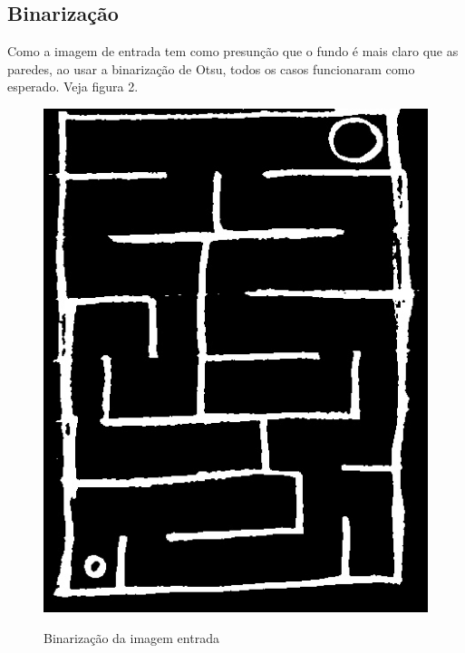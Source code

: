 \documentclass[conference]{IEEEtran}
\begin{document}
 \subsection{Binarização}
 Como a imagem de entrada tem como presunção que o fundo é mais claro que as paredes, ao usar a binarização de Otsu, todos os casos funcionaram como esperado. Veja figura 2.
 \begin{figure}[h!]
   \centering
    {\includegraphics[scale=0.25]{edgeImagemedium.jpg}
    \label{fig:medium}
    \caption{Binarização da imagem entrada}
    }
\end{figure}
\end{document}
